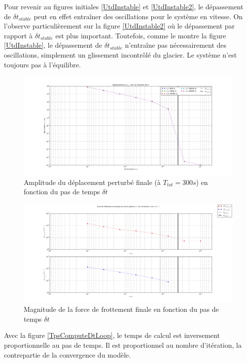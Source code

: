 \documentclass[11pt, a4paper]{article}
\begin{document}
Pour revenir au figures initiales \ref{UtdInstable} et  \ref{UtdInstable2}, le dépassement de $\delta t_{stable}$ peut en effet entraîner des oscillations pour le système en vitesse. On l'observe particulièrement sur la figure \ref{UtdInstable2} où le dépassement par rapport à $\delta t_{stable}$ est plus important. Toutefois, comme le montre la figure \ref{UtdInstable}, le dépassement de $\delta t_{stable}$ n'entraîne pas nécessairement des oscillations, simplement un glissement incontrôlé du glacier. Le système n'est toujours pas à l'équilibre.
\begin{figure}[h!]
    \centering
    \includegraphics[width=1\linewidth]{figures/Part2/Deplacement.png}
    \caption{Amplitude du déplacement perturbé finale (à $T_{tot} = 300s$) en fonction du pas de temps $\delta t $}
    \label{UendDtLoop}
\end{figure}
\begin{figure}[h!]
    \centering
    \includegraphics[width=1\linewidth]{figures/Part2/ForcesFrottement.png}
    \caption{Magnitude de la force de frottement finale en fonction du pas de temps $\delta t$}
    \label{FsismiqueDtLoop}
\end{figure}
Avec la figure \ref{TpsComputeDtLoop}, le temps de calcul est inversement proportionnelle au pas de temps. Il est proportionnel au nombre d'itération, la contrepartie de la convergence du modèle.
\end{document}
